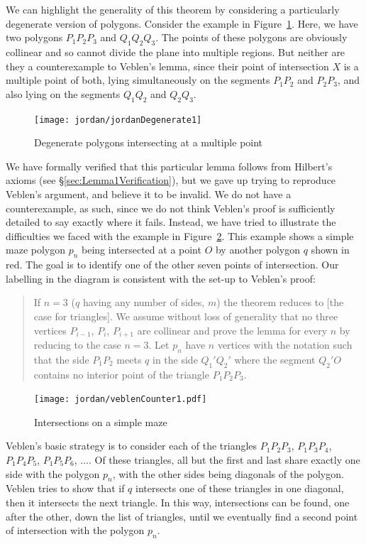 We can highlight the generality of this theorem by considering a particularly degenerate version of polygons. Consider the example in Figure~\ref{fig:jordanDegenerate1}. Here, we have two polygons $P_1P_2P_3$ and $Q_1Q_2Q_3$. The points of these polygons are obviously collinear and so cannot divide the plane into multiple regions. But neither are they a counterexample to Veblen's lemma, since their point of intersection $X$ is a multiple point of both, lying simultaneously on the segments $P_1P_2$ and $P_2P_3$, and also lying on the segments $Q_1Q_2$ and $Q_2Q_3$.

\begin{figure}
\centering
\texttt{[image: jordan/jordanDegenerate1]}
\caption{Degenerate polygons intersecting at a multiple point}
\label{fig:jordanDegenerate1}
\end{figure}

We have formally verified that this particular lemma follows from Hilbert's axioms (see \S\ref{sec:Lemma1Verification}), but we gave up trying to reproduce Veblen's argument, and believe it to be invalid. We do not have a counterexample, as such, since we do not think Veblen's proof is sufficiently detailed to say exactly where it fails. Instead, we have tried to illustrate the difficulties we faced with the example in Figure~\ref{fig:VeblenCounter1}. This example shows a simple maze polygon $p_n$ being intersected at a point $O$ by another polygon $q$ shown in red. The goal is to identify one of the other seven points of intersection. Our labelling in the diagram is consistent with the set-up to Veblen's proof:

\begin{quote}
If $n=3$ ($q$ having any number of sides, $m$) the theorem reduces to [the case for triangles]. We assume without loss of generality that no three vertices $P_{i-1}$, $P_i$, $P_{i+1}$ are collinear and prove the lemma for every $n$ by reducing to the case $n=3$. Let $p_n$ have $n$ vertices with the notation such that the side $P_1P_2$ meets $q$ in the side $Q_1'Q_2'$ where the segment $Q_2'O$ contains no interior point of the triangle $P_1P_2P_3$.\end{quote}

\begin{figure}
\centering
\texttt{[image: jordan/veblenCounter1.pdf]}
\caption{Intersections on a simple maze}
\label{fig:VeblenCounter1}
\end{figure}

Veblen's basic strategy is to consider each of the triangles $P_1P_2P_3$, $P_1P_3P_4$, $P_1P_4P_5$, $P_1P_5P_6$, $\ldots$. Of these triangles, all but the first and last share exactly one side with the polygon $p_n$, with the other sides being diagonals of the polygon. Veblen tries to show that if $q$ intersects one of these triangles in one diagonal, then it intersects the next triangle. In this way, intersections can be found, one after the other, down the list of triangles, until we eventually find a second point of intersection with the polygon $p_n$.

